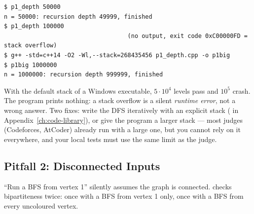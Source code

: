 \begin{diagrambox}
\end{diagrambox}

\begin{lstlisting}[style=trace]
$ p1_depth 50000
n = 50000: recursion depth 49999, finished
$ p1_depth 100000
                                   (no output, exit code 0xC00000FD = stack overflow)
$ g++ -std=c++14 -O2 -Wl,--stack=268435456 p1_depth.cpp -o p1big
$ p1big 1000000
n = 1000000: recursion depth 999999, finished
\end{lstlisting}

With the default stack of a Windows executable, $5\cdot 10^4$ levels pass and $10^5$ crash. The program prints nothing: a stack overflow is a silent \emph{runtime error}, not a wrong answer. Two fixes: write the DFS iteratively with an explicit stack ( in Appendix~\ref{ch:code-library}), or give the program a larger stack --- most judges (Codeforces, AtCoder) already run with a large one, but you cannot rely on it everywhere, and your local tests must use the same limit as the judge.

\subsection{Pitfall 2: Disconnected Inputs}
\label{ssec:ts-p2}

``Run a BFS from vertex 1'' silently assumes the graph is connected.  checks bipartiteness twice: once with a BFS from vertex 1 only, once with a BFS from every uncoloured vertex.

